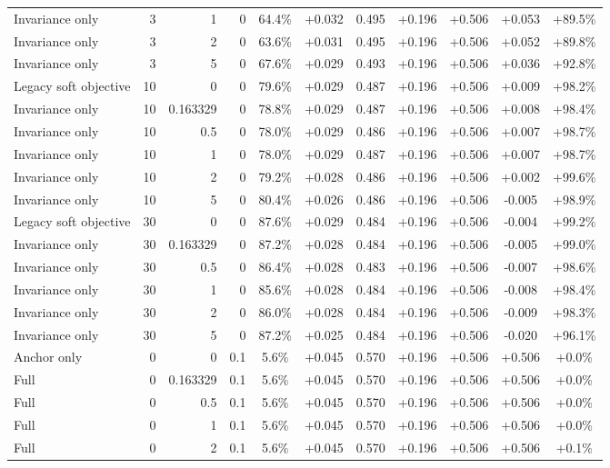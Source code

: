\begin{table}[htbp]
\begin{tabular}{lrrrccccccc}
Invariance only & 3 & 1 & 0 & 64.4\% & +0.032 & 0.495 & +0.196 & +0.506 & +0.053 & +89.5\% \\
Invariance only & 3 & 2 & 0 & 63.6\% & +0.031 & 0.495 & +0.196 & +0.506 & +0.052 & +89.8\% \\
Invariance only & 3 & 5 & 0 & 67.6\% & +0.029 & 0.493 & +0.196 & +0.506 & +0.036 & +92.8\% \\
Legacy soft objective & 10 & 0 & 0 & 79.6\% & +0.029 & 0.487 & +0.196 & +0.506 & +0.009 & +98.2\% \\
Invariance only & 10 & 0.163329 & 0 & 78.8\% & +0.029 & 0.487 & +0.196 & +0.506 & +0.008 & +98.4\% \\
Invariance only & 10 & 0.5 & 0 & 78.0\% & +0.029 & 0.486 & +0.196 & +0.506 & +0.007 & +98.7\% \\
Invariance only & 10 & 1 & 0 & 78.0\% & +0.029 & 0.487 & +0.196 & +0.506 & +0.007 & +98.7\% \\
Invariance only & 10 & 2 & 0 & 79.2\% & +0.028 & 0.486 & +0.196 & +0.506 & +0.002 & +99.6\% \\
Invariance only & 10 & 5 & 0 & 80.4\% & +0.026 & 0.486 & +0.196 & +0.506 & -0.005 & +98.9\% \\
Legacy soft objective & 30 & 0 & 0 & 87.6\% & +0.029 & 0.484 & +0.196 & +0.506 & -0.004 & +99.2\% \\
Invariance only & 30 & 0.163329 & 0 & 87.2\% & +0.028 & 0.484 & +0.196 & +0.506 & -0.005 & +99.0\% \\
Invariance only & 30 & 0.5 & 0 & 86.4\% & +0.028 & 0.483 & +0.196 & +0.506 & -0.007 & +98.6\% \\
Invariance only & 30 & 1 & 0 & 85.6\% & +0.028 & 0.484 & +0.196 & +0.506 & -0.008 & +98.4\% \\
Invariance only & 30 & 2 & 0 & 86.0\% & +0.028 & 0.484 & +0.196 & +0.506 & -0.009 & +98.3\% \\
Invariance only & 30 & 5 & 0 & 87.2\% & +0.025 & 0.484 & +0.196 & +0.506 & -0.020 & +96.1\% \\
Anchor only & 0 & 0 & 0.1 & 5.6\% & +0.045 & 0.570 & +0.196 & +0.506 & +0.506 & +0.0\% \\
Full & 0 & 0.163329 & 0.1 & 5.6\% & +0.045 & 0.570 & +0.196 & +0.506 & +0.506 & +0.0\% \\
Full & 0 & 0.5 & 0.1 & 5.6\% & +0.045 & 0.570 & +0.196 & +0.506 & +0.506 & +0.0\% \\
Full & 0 & 1 & 0.1 & 5.6\% & +0.045 & 0.570 & +0.196 & +0.506 & +0.506 & +0.0\% \\
Full & 0 & 2 & 0.1 & 5.6\% & +0.045 & 0.570 & +0.196 & +0.506 & +0.506 & +0.1\% \\

\end{tabular}
\end{table}
